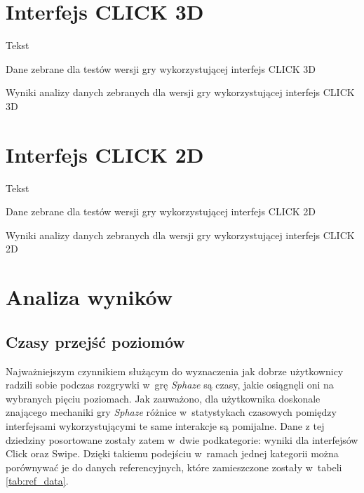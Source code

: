 \documentclass[a4paper,12pt,numbers=noenddot]{report}
\begin{document}
\section{Interfejs CLICK 3D}%
Tekst

\begin{table}
  \caption{Dane zebrane dla testów wersji gry wykorzystującej interfejs CLICK 3D}
  \resizebox{0.9\textwidth}{!}{%
	
  }
  \label{tab:results_CLICK3d}%
  \caption{Wyniki analizy danych zebranych dla wersji gry wykorzystującej interfejs CLICK 3D}
  \resizebox{0.9\textwidth}{!}{%
	
  }
  \label{tab:analysis_CLICK3d}%
\end{table}%

\section{Interfejs CLICK 2D}%
Tekst
\begin{table}
  \caption{Dane zebrane dla testów wersji gry wykorzystującej interfejs CLICK 2D}
  \resizebox{\textwidth}{!}{%
	
  }
  \label{tab:results_CLICK2d}%
  \caption{Wyniki analizy danych zebranych dla wersji gry wykorzystującej interfejs CLICK 2D}
  \resizebox{\textwidth}{!}{%
	
  }
  \label{tab:analysis_CLICK2d}%
\end{table}%

\section{Analiza wyników}
\subsection{Czasy przejść poziomów}
Najważniejszym czynnikiem służącym do wyznaczenia jak dobrze użytkownicy radzili sobie podczas rozgrywki w~grę \textit{Sphaze} są czasy, jakie osiągnęli oni na wybranych pięciu poziomach. Jak zauważono, dla użytkownika doskonale znającego mechaniki gry \textit{Sphaze} różnice w~statystykach czasowych pomiędzy interfejsami wykorzystującymi te same interakcje są pomijalne. Dane z tej dziedziny posortowane zostały zatem w~dwie podkategorie: wyniki dla interfejsów Click oraz Swipe. Dzięki takiemu podejściu w~ramach jednej kategorii można porównywać je do danych referencyjnych, które zamieszczone zostały w~tabeli \ref{tab:ref_data}. 
\end{document}
